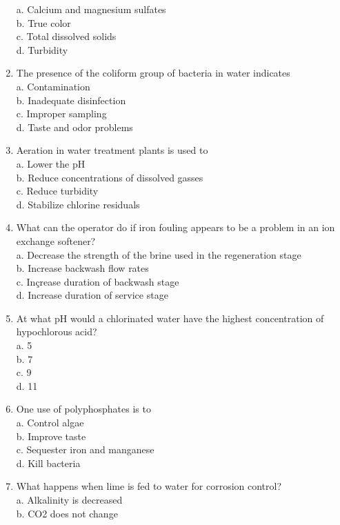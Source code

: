 \begin{enumerate}
a. Calcium and magnesium sulfates\\
b. True color\\
c. Total dissolved solids\\
d. Turbidity\\
\item The presence of the coliform group of bacteria in water indicates\\
a. Contamination\\
b. Inadequate disinfection\\
c. Improper sampling\\
d. Taste and odor problems\\
\item Aeration in water treatment plants is used to\\
a. Lower the $\mathrm{pH}$\\
b. Reduce concentrations of dissolved gasses\\
c. Reduce turbidity\\
d. Stabilize chlorine residuals\\
\item What can the operator do if iron fouling appears to be a problem in an ion exchange softener?\\
a. Decrease the strength of the brine used in the regeneration stage\\
b. Increase backwash flow rates\\
c. Inçrease duration of backwash stage\\
d. Increase duration of service stage\\
\item At what $\mathrm{pH}$ would a chlorinated water have the highest concentration of hypochlorous acid?\\
a. 5\\
b. 7\\
c. 9\\
d. 11\\
\item One use of polyphosphates is to\\
a. Control algae\\
b. Improve taste\\
c. Sequester iron and manganese\\
d. Kill bacteria\\
\item What happens when lime is fed to water for corrosion control?\\
a. Alkalinity is decreased\\
b. CO2 does not change\\

\end{enumerate}
